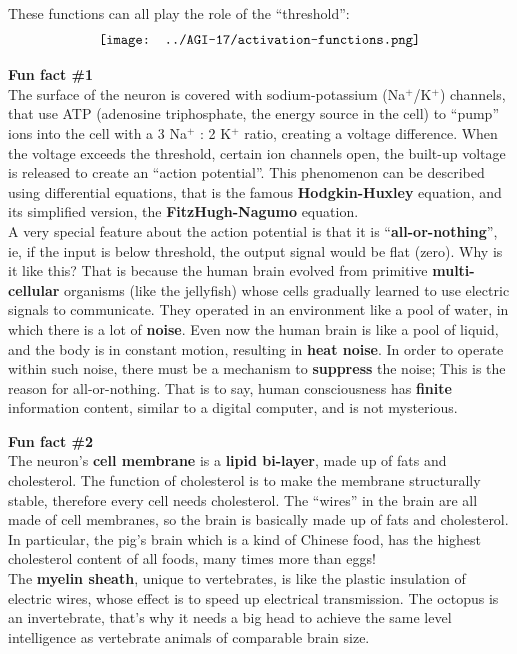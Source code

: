 \documentclass[orivec]{llncs}
\begin{document}
These functions can all play the role of the ``threshold'':
\begin{equation}
\vcenter{\hbox{\texttt{[image: ../AGI-17/activation-functions.png]}}}
\end{equation}

\begin{tcolorbox}
\textbf{Fun fact \#1}\\

The surface of the neuron is covered with sodium-potassium (Na$^+$/K$^+$) channels, that use ATP (adenosine triphosphate, the energy source in the cell) to ``pump'' ions into the cell with a 3 Na$^+$ : 2 K$^+$ ratio, creating a voltage difference.   When the voltage exceeds the threshold, certain ion channels open, the built-up voltage is released to create an ``action potential''.  This phenomenon can be described using differential equations, that is the famous \textbf{Hodgkin-Huxley} equation, and its simplified version, the \textbf{FitzHugh-Nagumo} equation.\\

A very special feature about the action potential is that it is ``\textbf{all-or-nothing}'', ie, if the input is below threshold, the output signal would be flat (zero).  Why is it like this?  That is because the human brain evolved from primitive \textbf{multi-cellular} organisms (like the jellyfish) whose cells gradually learned to use electric signals to communicate.  They operated in an environment like a pool of water, in which there is a lot of \textbf{noise}.  Even now the human brain is like a pool of liquid, and the body is in constant motion, resulting in \textbf{heat noise}.  In order to operate within such noise, there must be a mechanism to \textbf{suppress} the noise;  This is the reason for all-or-nothing.  That is to say, human consciousness has \textbf{finite} information content, similar to a digital computer, and is not mysterious.
\end{tcolorbox}

\begin{tcolorbox}
\textbf{Fun fact \#2} \\

The neuron's \textbf{cell membrane} is a \textbf{lipid bi-layer}, made up of fats and cholesterol.  The function of cholesterol is to make the membrane structurally stable, therefore every cell needs cholesterol.  The ``wires'' in the brain are all made of cell membranes, so the brain is basically made up of fats and cholesterol.  In particular, the pig's brain which is a kind of Chinese food, has the highest cholesterol content of all foods, many times more than eggs! \\

The \textbf{myelin sheath}, unique to vertebrates, is like the plastic insulation of electric wires, whose effect is to speed up electrical transmission.  The octopus is an invertebrate, that's why it needs a big head to achieve the same level intelligence as vertebrate animals of comparable brain size.
\end{tcolorbox}
\end{document}
